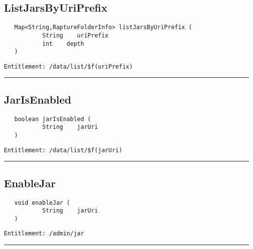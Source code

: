 \subsection{ListJarsByUriPrefix}
\label{Api:ListJarsByUriPrefix}
\begin{verbatim}
   Map<String,RaptureFolderInfo> listJarsByUriPrefix (
           String    uriPrefix
           int    depth
   )
\end{verbatim}
\begin{Verbatim}[fontsize=\small, formatcom=\color{Maroon}]
  Entitlement: /data/list/$f(uriPrefix)
\end{Verbatim}



\rule{12cm}{2pt}
\subsection{JarIsEnabled}
\label{Api:JarIsEnabled}
\begin{verbatim}
   boolean jarIsEnabled (
           String    jarUri
   )
\end{verbatim}
\begin{Verbatim}[fontsize=\small, formatcom=\color{Maroon}]
  Entitlement: /data/list/$f(jarUri)
\end{Verbatim}



\rule{12cm}{2pt}
\subsection{EnableJar}
\label{Api:EnableJar}
\begin{verbatim}
   void enableJar (
           String    jarUri
   )
\end{verbatim}
\begin{Verbatim}[fontsize=\small, formatcom=\color{Maroon}]
  Entitlement: /admin/jar
\end{Verbatim}



\rule{12cm}{2pt}
